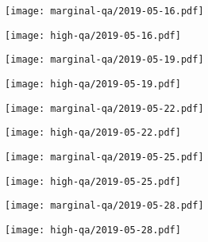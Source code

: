 \documentclass{article}
\begin{document}
\begin{figure}[H]
	\ContinuedFloat
	\centering
	\begin{subfigure}{0.48\linewidth}
		\texttt{[image: marginal-qa/2019-05-16.pdf]}
	\end{subfigure}
	\begin{subfigure}{0.48\linewidth}
		\texttt{[image: high-qa/2019-05-16.pdf]}
	\end{subfigure}
	\begin{subfigure}{0.48\linewidth}
		\texttt{[image: marginal-qa/2019-05-19.pdf]}
	\end{subfigure}
	\begin{subfigure}{0.48\linewidth}
		\texttt{[image: high-qa/2019-05-19.pdf]}
	\end{subfigure}
	\begin{subfigure}{0.48\linewidth}
		\texttt{[image: marginal-qa/2019-05-22.pdf]}
	\end{subfigure}
	\begin{subfigure}{0.48\linewidth}
		\texttt{[image: high-qa/2019-05-22.pdf]}
	\end{subfigure}
	\begin{subfigure}{0.48\linewidth}
		\texttt{[image: marginal-qa/2019-05-25.pdf]}
	\end{subfigure}
	\begin{subfigure}{0.48\linewidth}
		\texttt{[image: high-qa/2019-05-25.pdf]}
	\end{subfigure}
	\begin{subfigure}{0.48\linewidth}
		\texttt{[image: marginal-qa/2019-05-28.pdf]}
	\end{subfigure}
	\begin{subfigure}{0.48\linewidth}
		\texttt{[image: high-qa/2019-05-28.pdf]}
	\end{subfigure}
\end{figure}
\end{document}
